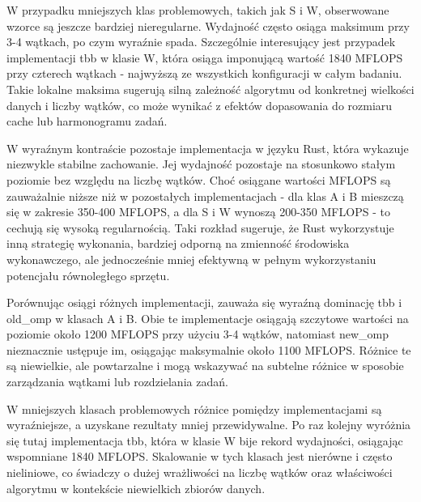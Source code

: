 W przypadku mniejszych klas problemowych, takich jak S i W, obserwowane wzorce są jeszcze bardziej nieregularne. Wydajność często osiąga maksimum przy 3-4 wątkach, po czym wyraźnie spada. Szczególnie interesujący jest przypadek implementacji tbb w klasie W, która osiąga imponującą wartość 1840 MFLOPS przy czterech wątkach - najwyższą ze wszystkich konfiguracji w całym badaniu. Takie lokalne maksima sugerują silną zależność algorytmu od konkretnej wielkości danych i liczby wątków, co może wynikać z efektów dopasowania do rozmiaru cache lub harmonogramu zadań.

W wyraźnym kontraście pozostaje implementacja w języku Rust, która wykazuje niezwykle stabilne zachowanie. Jej wydajność pozostaje na stosunkowo stałym poziomie bez względu na liczbę wątków. Choć osiągane wartości MFLOPS są zauważalnie niższe niż w pozostałych implementacjach - dla klas A i B mieszczą się w zakresie 350-400 MFLOPS, a dla S i W wynoszą 200-350 MFLOPS - to cechują się wysoką regularnością. Taki rozkład sugeruje, że Rust wykorzystuje inną strategię wykonania, bardziej odporną na zmienność środowiska wykonawczego, ale jednocześnie mniej efektywną w pełnym wykorzystaniu potencjału równoległego sprzętu.

Porównując osiągi różnych implementacji, zauważa się wyraźną dominację tbb i old\_omp w klasach A i B. Obie te implementacje osiągają szczytowe wartości na poziomie około 1200 MFLOPS przy użyciu 3-4 wątków, natomiast new\_omp nieznacznie ustępuje im, osiągając maksymalnie około 1100 MFLOPS. Różnice te są niewielkie, ale powtarzalne i mogą wskazywać na subtelne różnice w sposobie zarządzania wątkami lub rozdzielania zadań.

W mniejszych klasach problemowych różnice pomiędzy implementacjami są wyraźniejsze, a uzyskane rezultaty mniej przewidywalne. Po raz kolejny wyróżnia się tutaj implementacja tbb, która w klasie W bije rekord wydajności, osiągając wspomniane 1840 MFLOPS. Skalowanie w tych klasach jest nierówne i często nieliniowe, co świadczy o dużej wrażliwości na liczbę wątków oraz właściwości algorytmu w kontekście niewielkich zbiorów danych.

